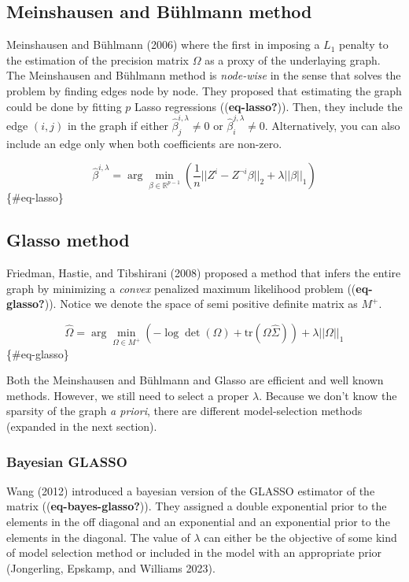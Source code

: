 \documentclass[
]{article}
\begin{document}
\hypertarget{meinshausen-and-buxfchlmann-method}{%
\subsection{Meinshausen and Bühlmann
method}\label{meinshausen-and-buxfchlmann-method}}

Meinshausen and Bühlmann (2006) where the first in imposing a \(L_1\)
penalty to the estimation of the precision matrix \(\Omega\) as a proxy
of the underlaying graph. The Meinshausen and Bühlmann method is
\emph{node-wise} in the sense that solves the problem by finding edges
node by node. They proposed that estimating the graph could be done by
fitting \(p\) Lasso regressions ((\textbf{eq-lasso?})). Then, they
include the edge \((i, j)\) in the graph if either
\(\hat \beta^{i, \lambda}_j \ne0\) or
\(\hat \beta^{j, \lambda}_i \ne0\). Alternatively, you can also include
an edge only when both coefficients are non-zero.

\[
\hat \beta^{i, \lambda} = \arg \min_{\beta \in \mathbb R^{p-1}} (\frac 1 n ||Z^i-Z^{\neg i}\beta||_2 + \lambda||\beta||_1) 
\] \{\#eq-lasso\}

\hypertarget{glasso-method}{%
\subsection{Glasso method}\label{glasso-method}}

Friedman, Hastie, and Tibshirani (2008) proposed a method that infers
the entire graph by minimizing a \emph{convex} penalized maximum
likelihood problem ((\textbf{eq-glasso?})). Notice we denote the space
of semi positive definite matrix as \(M^+\).

\[
\hat \Omega = \arg \min_{\Omega \in M^+} (-\log\det(\Omega) + \text{tr}(\Omega\hat \Sigma)) + \lambda ||\Omega||_1
\] \{\#eq-glasso\}

Both the Meinshausen and Bühlmann and Glasso are efficient and well
known methods. However, we still need to select a proper \(\lambda\).
Because we don't know the sparsity of the graph \emph{a priori}, there
are different model-selection methods (expanded in the next section).

\hypertarget{bayesian-glasso}{%
\subsubsection{\texorpdfstring{\textbf{Bayesian
GLASSO}}{Bayesian GLASSO}}\label{bayesian-glasso}}

Wang (2012) introduced a bayesian version of the GLASSO estimator of the
matrix ((\textbf{eq-bayes-glasso?})). They assigned a double exponential
prior to the elements in the off diagonal and an exponential and an
exponential prior to the elements in the diagonal. The value of
\(\lambda\) can either be the objective of some kind of model selection
method or included in the model with an appropriate prior (Jongerling,
Epskamp, and Williams 2023).
\end{document}

